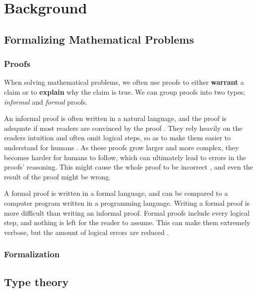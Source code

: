 \chapter{Background}

\section{Formalizing Mathematical Problems}

\subsection{Proofs}

When solving mathematical problems, we often use proofs
to either \textbf{warrant} a claim or to \textbf{explain} why the claim is true.
We can group proofs into two types; \textit{informal} and \textit{formal} proofs.


An informal proof is often written in a natural language, and the proof is adequate if most
readers are convinced by the proof \cite{bpierce}. They rely heavily on the readers intuition
and often omit logical steps, so as to make them easier to understand for humans \cite{ams:formal-proof}.
As these proofs grow larger and more complex, they becomes harder for humans to follow,
which can ultimately lead to errors in the proofs' reasoning. This might cause the whole proof
to be incorrect \cite{rkhamsi}, and even the result of the proof might be wrong.

A formal proof is written in a formal language, and can be compared to a computer program
written in a programming language. Writing a formal proof is more difficult than writing an informal proof.
Formal proofs include every logical step, and nothing is left for the reader to assume.
This can make them extremely verbose, but the amount of logical errors are reduced \cite{ams:formal-proof}.

\subsection{Formalization}

\section{Type theory}

